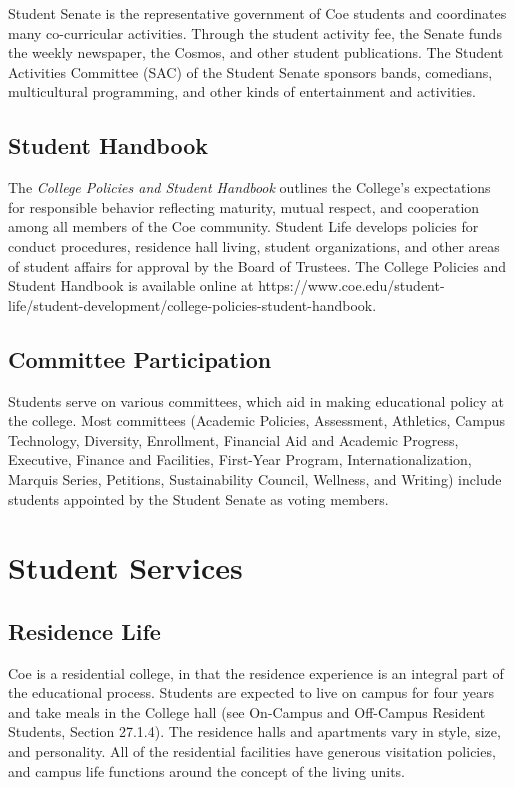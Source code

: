 \documentclass[
  letterpaper,
]{scrbook}
\begin{document}
Student Senate is the representative government of Coe students and
coordinates many co-curricular activities. Through the student activity
fee, the Senate funds the weekly newspaper, the Cosmos, and other
student publications. The Student Activities Committee (SAC) of the
Student Senate sponsors bands, comedians, multicultural programming, and
other kinds of entertainment and activities.

\subsection{Student Handbook}\label{student-handbook}

The \emph{College Policies and Student Handbook} outlines the College's
expectations for responsible behavior reflecting maturity, mutual
respect, and cooperation among all members of the Coe community. Student
Life develops policies for conduct procedures, residence hall living,
student organizations, and other areas of student affairs for approval
by the Board of Trustees. The College Policies and Student Handbook is
available online at
https://www.coe.edu/student-life/student-development/college-policies-student-handbook.

\subsection{Committee Participation}\label{committee-participation}

Students serve on various committees, which aid in making educational
policy at the college. Most committees (Academic Policies, Assessment,
Athletics, Campus Technology, Diversity, Enrollment, Financial Aid and
Academic Progress, Executive, Finance and Facilities, First-Year
Program, Internationalization, Marquis Series, Petitions, Sustainability
Council, Wellness, and Writing) include students appointed by the
Student Senate as voting members.

\section{Student Services}\label{student-services}

\subsection{Residence Life}\label{residence-life}

Coe is a residential college, in that the residence experience is an
integral part of the educational process. Students are expected to live
on campus for four years and take meals in the College hall (see
On-Campus and Off-Campus Resident Students, Section 27.1.4). The
residence halls and apartments vary in style, size, and personality. All
of the residential facilities have generous visitation policies, and
campus life functions around the concept of the living units.
\end{document}
